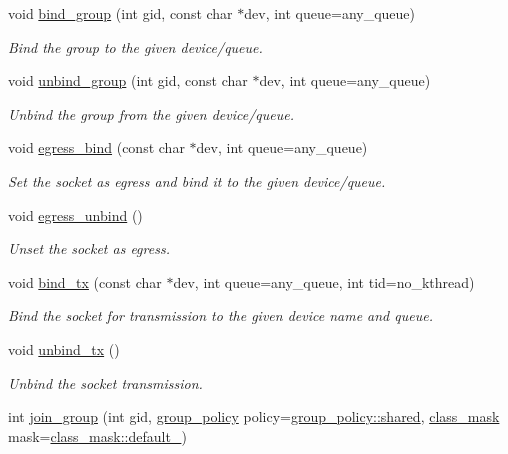 \begin{DoxyCompactItemize}
void \hyperlink{classpfq_1_1socket_a4d4d44cc68af0290e3c494dcd10b1541}{bind\+\_\+group} (int gid, const char $\ast$dev, int queue=any\+\_\+queue)
\begin{DoxyCompactList}\small\item\em Bind the group to the given device/queue. \end{DoxyCompactList}\item 
void \hyperlink{classpfq_1_1socket_a6e1f7ee7f44b6824d734d4ff7046d907}{unbind\+\_\+group} (int gid, const char $\ast$dev, int queue=any\+\_\+queue)
\begin{DoxyCompactList}\small\item\em Unbind the group from the given device/queue. \end{DoxyCompactList}\item 
void \hyperlink{classpfq_1_1socket_a2c96741054ea764f5d8c31295ef5df29}{egress\+\_\+bind} (const char $\ast$dev, int queue=any\+\_\+queue)
\begin{DoxyCompactList}\small\item\em Set the socket as egress and bind it to the given device/queue. \end{DoxyCompactList}\item 
void \hyperlink{classpfq_1_1socket_ae80718e8f26cdaed3fd05bfde6d835e0}{egress\+\_\+unbind} ()
\begin{DoxyCompactList}\small\item\em Unset the socket as egress. \end{DoxyCompactList}\item 
void \hyperlink{classpfq_1_1socket_a177de236ffec9f988df80b5c1725ba96}{bind\+\_\+tx} (const char $\ast$dev, int queue=any\+\_\+queue, int tid=no\+\_\+kthread)
\begin{DoxyCompactList}\small\item\em Bind the socket for transmission to the given device name and queue. \end{DoxyCompactList}\item 
void \hyperlink{classpfq_1_1socket_a99ee5e145ccf3a043b3c2aacb3df30cc}{unbind\+\_\+tx} ()
\begin{DoxyCompactList}\small\item\em Unbind the socket transmission. \end{DoxyCompactList}\item 
int \hyperlink{classpfq_1_1socket_a118d0b045183cd226387e3851696c50f}{join\+\_\+group} (int gid, \hyperlink{namespacepfq_ac41249c8510558905b01fa4d866a38d7}{group\+\_\+policy} policy=\hyperlink{namespacepfq_ac41249c8510558905b01fa4d866a38d7a9e81e7b963c71363e2fb3eefcfecfc0e}{group\+\_\+policy\+::shared}, \hyperlink{namespacepfq_a96af1f5ed530eff563eb917516758fbb}{class\+\_\+mask} mask=\hyperlink{namespacepfq_a96af1f5ed530eff563eb917516758fbba172b03053216c6158fe380805998ad6c}{class\+\_\+mask\+::default\+\_\+})

\end{DoxyCompactItemize}
